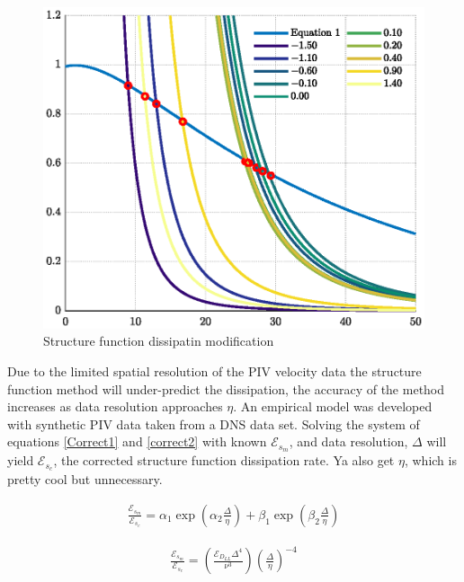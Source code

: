 \documentclass{article}
\newcommand\dsize[1]{\ensuremath{\mathcal{\scriptstyle {#1} } }} %
\newcommand{\diss}{\dsize{E}}
\newcommand{\Deltait}{\mathit{\Delta}}
\newenvironment{myeq}   %
    {\begin{equation}
    \begin{gathered}
    }
    {
    \end{gathered}
    \end{equation}
    }
\begin{document}
\begin{figure}[t]
    \centering
    \includegraphics[scale = 0.6]{figs/Sdiff_Modification.eps}
    \caption{Structure function dissipatin modification}
    \label{SdiffMod}
\end{figure}

Due to the limited spatial resolution of the PIV velocity data the structure function method will under-predict the dissipation, the accuracy of the method increases as data resolution approaches $\eta$. An empirical model was developed with synthetic PIV data taken from a DNS data set. Solving the system of equations \ref{Correct1} and \ref{correct2} with known $\diss_{s_m}$, and data resolution, $\Deltait$ will yield $\diss_{s_c}$, the corrected structure function dissipation rate. Ya also get $\eta$, which is pretty cool but unnecessary.

\begin{myeq}
    \frac{\diss_{s_m}} {\diss_{s_c}} = \alpha_1 \exp{\left( \alpha_2 \frac{\Deltait}{\eta} \right)}
        + \beta_1 \exp{\left( \beta_2 \frac{\Deltait}{\eta} \right)}
    \label{Correct1}
\end{myeq}

\begin{myeq}
    \frac{\diss_{s_m}}{\diss_{s_c}} = \left( \frac{\diss_{D_{LL}} \Deltait^4 }{\nu^3} \right) \left(            \frac{\Deltait}{\eta} \right)^{-4} 
    \label{correct2}
\end{myeq}
\end{document}
